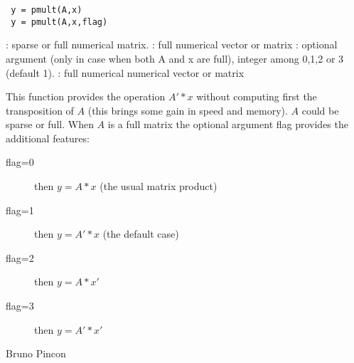 
\begin{mandesc}
\end{mandesc}

\begin{calling_sequence}
\begin{verbatim}
 y = pmult(A,x) 
 y = pmult(A,x,flag)
\end{verbatim}
\end{calling_sequence}
\begin{parameters}
  \begin{varlist}
    :  sparse or full numerical matrix.
    : full numerical vector or matrix
     : optional argument (only in case when both A and x are full), integer among 0,1,2 or 3 (default 1).
     : full numerical numerical vector or matrix
  \end{varlist}
\end{parameters}

\begin{mandescription}
This function provides the operation $A'*x$ without computing first the transposition of $A$
(this brings some gain in speed and memory). $A$ could be sparse or full. When $A$ is a full
matrix the optional argument flag provides the additional features:
\begin{description}
\item[flag=0] then $y = A*x$ (the usual matrix product)
\item[flag=1] then $y = A'*x$ (the default case)
\item[flag=2] then $y = A*x'$
\item[flag=3] then $y = A'*x'$
\end{description} 
\end{mandescription}

\begin{examples}
  \begin{program}  
\end{program}
\end{examples}


\begin{authors}
   Bruno Pincon
\end{authors}
